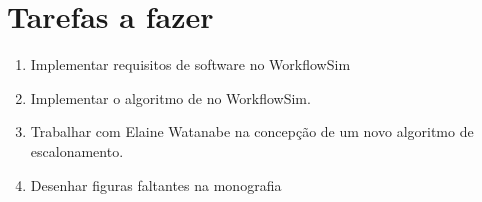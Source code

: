 \section{Tarefas a fazer}
\label{sec:tarefas_a_fazer}
	\begin{enumerate}
		\item Implementar requisitos de software no WorkflowSim
		\item Implementar o algoritmo de \cite{chaves:scheduling_software_requirements} 
		no WorkflowSim.
		\item Trabalhar com Elaine Watanabe na concepção de um novo algoritmo 
		de escalonamento.
		\item Desenhar figuras faltantes na monografia
	\end{enumerate}

